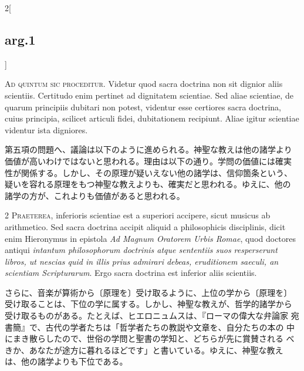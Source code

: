 \documentclass[
paper=a4paper,
fontsize=10pt,
jafontsize=9pt,
titlepage
]{jlreq}
\begin{document}
\begin{paracol}{2}[\subsection{arg.1}]

{\Huge A}{\scshape d quintum sic proceditur}. Videtur quod sacra
doctrina non sit dignior aliis scientiis. Certitudo enim pertinet ad
dignitatem scientiae. Sed aliae scientiae, de quarum principiis
dubitari non potest, videntur esse certiores sacra doctrina, cuius
principia, scilicet articuli fidei, dubitationem recipiunt. Aliae
igitur scientiae videntur ista digniores.

\switchcolumn

第五項の問題へ、議論は以下のように進められる。神聖な教えは他の諸学より
価値が高いわけではないと思われる。理由は以下の通り。学問の価値には確実
性が関係する。しかし、その原理が疑いえない他の諸学は、信仰箇条という、
疑いを容れる原理をもつ神聖な教えよりも、確実だと思われる。ゆえに、他の
諸学の方が、これよりも価値があると思われる。


{\scshape 2 Praeterea}, inferioris scientiae est a superiori accipere,
sicut musicus ab arithmetico. Sed sacra doctrina accipit aliquid a
philosophicis disciplinis, dicit enim Hieronymus in epistola {\itshape
Ad Magnum Oratorem Urbis Romae}, quod doctores antiqui {\itshape
intantum philosophorum doctrinis atque sententiis suos resperserunt
libros, ut nescias quid in illis prius admirari debeas, eruditionem
saeculi, an scientiam Scripturarum}. Ergo sacra doctrina est inferior
aliis scientiis.

\switchcolumn

さらに、音楽が算術から〔原理を〕受け取るように、上位の学から〔原理を〕
受け取ることは、下位の学に属する。しかし、神聖な教えが、哲学的諸学から
受け取るものがある。たとえば、ヒエロニュムスは、『ローマの偉大な弁論家
宛書簡』で、古代の学者たちは「哲学者たちの教説や文章を、自分たちの本の
中にまき散らしたので、世俗の学問と聖書の学知と、どちらが先に賞賛される
べきか、あなたが途方に暮れるほどです」と書いている。ゆえに、神聖な教え
は、他の諸学よりも下位である。

\switchcolumn*[\subsection{s.c.}]


\end{paracol}
\end{document}
